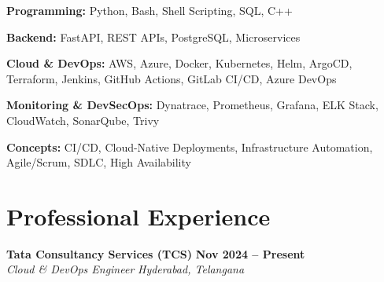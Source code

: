 \documentclass[letterpaper,9pt]{article}
\newcommand{\resumeSubheading}[4]{
\vspace{1pt}
\textbf{#1} \hfill \textbf{\small #2} \\
\textit{#3} \hfill \textit{\small #4}
\vspace{1pt}
}
\begin{document}
\small{

\textbf{Programming:}
Python, Bash, Shell Scripting, SQL, C++

\vspace{1pt}

\textbf{Backend:}
FastAPI, REST APIs, PostgreSQL, Microservices

\vspace{1pt}

\textbf{Cloud \& DevOps:}
AWS, Azure, Docker, Kubernetes, Helm, ArgoCD, Terraform, Jenkins, GitHub Actions, GitLab CI/CD, Azure DevOps

\vspace{1pt}

\textbf{Monitoring \& DevSecOps:}
Dynatrace, Prometheus, Grafana, ELK Stack, CloudWatch, SonarQube, Trivy

\vspace{1pt}

\textbf{Concepts:}
CI/CD, Cloud-Native Deployments, Infrastructure Automation, Agile/Scrum, SDLC, High Availability

}


\section{Professional Experience}

\resumeSubheading
{Tata Consultancy Services (TCS)}{Nov 2024 -- Present}
{Cloud \& DevOps Engineer}{Hyderabad, Telangana}
\end{document}
